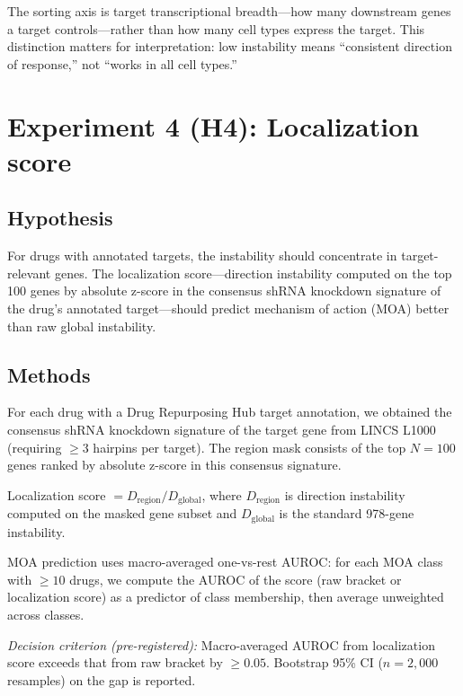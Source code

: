 \documentclass[11pt]{article}
\begin{document}
The sorting axis is target transcriptional breadth---how many
downstream genes a target controls---rather than how many cell types
express the target.  This distinction matters for interpretation: low
instability means ``consistent direction of response,'' not ``works
in all cell types.''

\section{Experiment 4 (H4): Localization score}
\label{sec:h4}

\subsection{Hypothesis}

For drugs with annotated targets, the instability should concentrate in
target-relevant genes.  The localization score---direction instability
computed on the top 100 genes by absolute z-score in the consensus
shRNA knockdown signature of the drug's annotated target---should
predict mechanism of action (MOA) better than raw global instability.

\subsection{Methods}

For each drug with a Drug Repurposing Hub target annotation, we obtained
the consensus shRNA knockdown signature of the target gene from LINCS
L1000 (requiring $\geq 3$ hairpins per target).  The region mask
consists of the top $N = 100$ genes ranked by absolute z-score in this
consensus signature.

Localization score $= D_{\text{region}} / D_{\text{global}}$, where
$D_{\text{region}}$ is direction instability computed on the masked gene
subset and $D_{\text{global}}$ is the standard 978-gene instability.

MOA prediction uses macro-averaged one-vs-rest AUROC: for each MOA class
with $\geq 10$ drugs, we compute the AUROC of the score (raw bracket or
localization score) as a predictor of class membership, then average
unweighted across classes.

\emph{Decision criterion (pre-registered):} Macro-averaged AUROC from
localization score exceeds that from raw bracket by $\geq 0.05$.
Bootstrap 95\% CI ($n = 2{,}000$ resamples) on the gap is reported.
\end{document}

